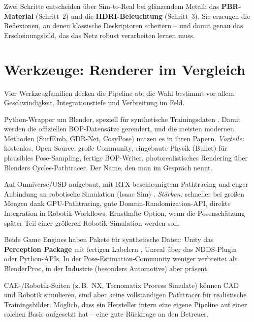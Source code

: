 \begin{infobox}[title=Der Knackpunkt bei Industrieteilen]
Zwei Schritte entscheiden über Sim-to-Real bei glänzendem Metall: das
\textbf{PBR-Material} (Schritt~2) und die \textbf{HDRI-Beleuchtung}
(Schritt~3). Sie erzeugen die Reflexionen, an denen klassische Deskriptoren
scheitern -- und damit genau das Erscheinungsbild, das das Netz robust
verarbeiten lernen muss.
\end{infobox}

\section{Werkzeuge: Renderer im Vergleich}
Vier Werkzeugfamilien decken die Pipeline ab; die Wahl bestimmt vor allem
Geschwindigkeit, Integrationstiefe und Verbreitung im Feld.

\begin{description}[style=nextline,leftmargin=1.4em]
\item[BlenderProc -- der De-facto-Standard.] Python-Wrapper um Blender, speziell
  für synthetische Trainingsdaten \cite{denninger2019blenderproc}. Damit werden
  die offiziellen BOP-Datensätze gerendert, und die meisten modernen Methoden
  (SurfEmb, GDR-Net, CosyPose) nutzen es in ihren Papern. \emph{Vorteile:}
  kostenlos, Open Source, große Community, eingebaute Physik (Bullet) für
  plausibles Pose-Sampling, fertige BOP-Writer, photorealistisches Rendering
  über Blenders Cycles-Pathtracer. Der Name, den man im Gespräch nennt.
\item[NVIDIA Omniverse Replicator / Isaac Sim -- die industrielle Alternative.]
  Auf Omniverse/USD aufgebaut, mit RTX-beschleunigtem Pathtracing und enger
  Anbindung an robotische Simulation (Isaac Sim) \cite{omniverse_replicator,isaacsim_docs}.
  \emph{Stärken:} schneller bei großen Mengen dank GPU-Pathtracing, gute
  Domain-Randomization-API, direkte Integration in Robotik-Workflows. Ernsthafte
  Option, wenn die Posenschätzung später Teil einer größeren Robotik-Simulation
  werden soll.
\item[Unity Perception / Unreal Engine.] Beide Game Engines haben Pakete für
  synthetische Daten: Unity das \textbf{Perception Package} mit fertigen Labelern
  \cite{unity_perception}, Unreal über das NDDS-Plugin oder Python-APIs. In der
  Pose-Estimation-Community weniger verbreitet als BlenderProc, in der Industrie
  (besonders Automotive) aber präsent.
\item[Spezialisierte / proprietäre Tools.] CAE-/Robotik-Suiten (z.\,B.\ NX,
  Tecnomatix Process Simulate) können CAD und Robotik simulieren, sind aber
  keine vollständigen Pathtracer für realistische Trainingsbilder. Möglich, dass
  ein Hersteller intern eine eigene Pipeline auf einer solchen Basis aufgesetzt
  hat -- eine gute Rückfrage an den Betreuer.
\end{description}

